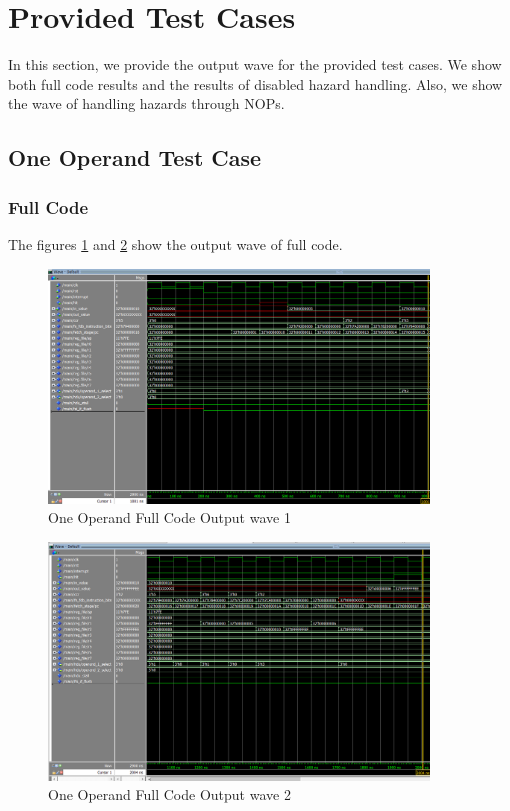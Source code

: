 \section{Provided Test Cases}
In this section, we provide the output wave for the provided test cases. We show both full code results and the results of disabled hazard handling. Also, we show the wave of handling hazards through NOPs.

\subsection{One Operand Test Case}

\subsubsection{Full Code}
The figures \ref{fig:1op_reg_1} and \ref{fig:1op_reg_2} show the output wave of full code.
\begin{figure}[H]
    \centering
    \includegraphics[width=0.9\textwidth]{images/test_cases/one_operand/OneOperand_regular_1.PNG}
    \caption{One Operand Full Code Output wave 1}
    \label{fig:1op_reg_1}
\end{figure}

\begin{figure}[H]
    \centering
    \includegraphics[width=0.9\textwidth]{images/test_cases/one_operand/OneOperand_regular_2.PNG}
    \caption{One Operand Full Code Output wave 2}
    \label{fig:1op_reg_2}
\end{figure}

